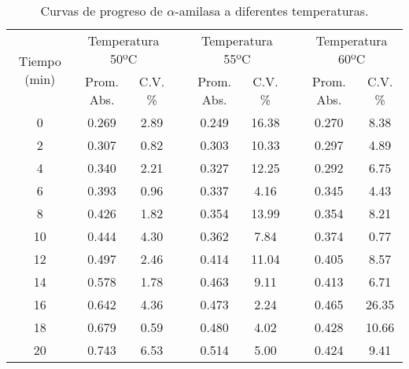 \documentclass{article}
\begin{document}
\begin{table}[H]
	\centering
	\caption{Curvas de progreso de  $\alpha$-amilasa a diferentes temperaturas.}
	\begin{tabular}{ccccccccc}
		\toprule
		\multirow{2}[4]{*}{Tiempo (min)} & \multicolumn{2}{c}{Temperatura 50ºC} &       & \multicolumn{2}{c}{Temperatura 55ºC} &       & \multicolumn{2}{c}{Temperatura 60ºC} \\
		\cmidrule{2-9}          & Prom. Abs. & C.V. \% &       & Prom. Abs. & C.V. \% &       & Prom. Abs. & C.V. \% \\
		\midrule
		0     & 0.269 & 2.89  &       & 0.249 & 16.38 &       & 0.270 & 8.38 \\
		2     & 0.307 & 0.82  &       & 0.303 & 10.33 &       & 0.297 & 4.89 \\
		4     & 0.340 & 2.21  &       & 0.327 & 12.25 &       & 0.292 & 6.75 \\
		6     & 0.393 & 0.96  &       & 0.337 & 4.16  &       & 0.345 & 4.43 \\
		8     & 0.426 & 1.82  &       & 0.354 & 13.99 &       & 0.354 & 8.21 \\
		10    & 0.444 & 4.30  &       & 0.362 & 7.84  &       & 0.374 & 0.77 \\
		12    & 0.497 & 2.46  &       & 0.414 & 11.04 &       & 0.405 & 8.57 \\
		14    & 0.578 & 1.78  &       & 0.463 & 9.11  &       & 0.413 & 6.71 \\
		16    & 0.642 & 4.36  &       & 0.473 & 2.24  &       & 0.465 & 26.35 \\
		18    & 0.679 & 0.59  &       & 0.480 & 4.02  &       & 0.428 & 10.66 \\
		20    & 0.743 & 6.53  &       & 0.514 & 5.00  &       & 0.424 & 9.41 \\
		\bottomrule
	\end{tabular}%
	\label{tab:a3}%
\end{table}%
\end{document}
